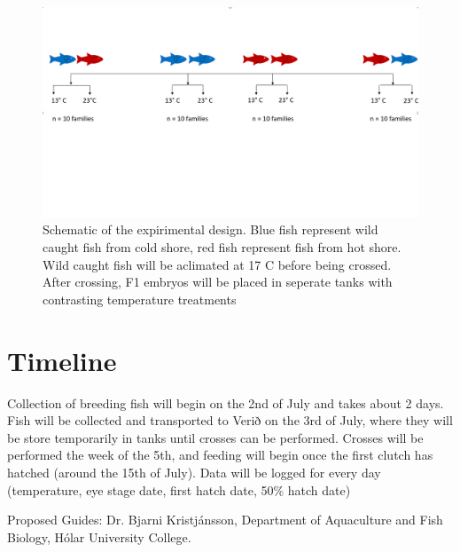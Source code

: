 \documentclass[12pt]{extarticle}
\begin{document}
\begin{figure}
 \centering
 \includegraphics[width=1\textwidth]{schematic}
 \caption{Schematic of the expirimental design. Blue fish represent wild caught fish from cold shore, red fish represent fish from hot shore. Wild caught fish will be aclimated at 17 \degree C before being crossed. After crossing, F1 embryos will be placed in seperate tanks with contrasting temperature treatments}
 \label{fig:schem}
\end{figure}


\section*{Timeline}
Collection of breeding fish will begin on the 2nd of July and takes about 2 days. Fish will be collected and transported to Verið on the 3rd of July, where they will be store temporarily in tanks until crosses can be performed. Crosses will be performed the week of the 5th, and feeding will begin once the first clutch has hatched (around the 15th of July). Data will be logged for every day (temperature, eye stage date, first hatch date, 50\% hatch date)

Proposed Guides: Dr. Bjarni Kristj\'ansson, Department of Aquaculture and Fish Biology, H\'olar University College.

\FloatBarrier


\end{document}
